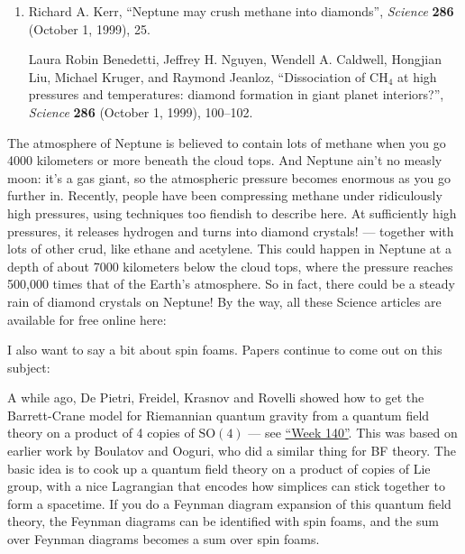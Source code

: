 \documentclass{article}
\def\tightlist{}
\renewcommand{\texttt}[1]{%
  \begingroup
  \ttfamily
  \begingroup\lccode`~=`/\lowercase{\endgroup\def~}{/\discretionary{}{}{}}%
  \begingroup\lccode`~=`[\lowercase{\endgroup\def~}{[\discretionary{}{}{}}%
  \begingroup\lccode`~=`.\lowercase{\endgroup\def~}{.\discretionary{}{}{}}%
  \catcode`/=\active\catcode`[=\active\catcode`.=\active
  \scantokens{#1\noexpand}%
  \endgroup
}
\begin{document}
\begin{enumerate}
\def\labelenumi{\arabic{enumi})}
\setcounter{enumi}{1}
\item
  Richard A. Kerr, ``Neptune may crush methane into diamonds'',
  \emph{Science} \textbf{286} (October 1, 1999), 25.

  Laura Robin Benedetti, Jeffrey H. Nguyen, Wendell A. Caldwell,
  Hongjian Liu, Michael Kruger, and Raymond Jeanloz, ``Dissociation of
  \(\mathrm{CH}_4\) at high pressures and temperatures: diamond
  formation in giant planet interiors?'', \emph{Science} \textbf{286}
  (October 1, 1999), 100--102.
\end{enumerate}

The atmosphere of Neptune is believed to contain lots of methane when
you go 4000 kilometers or more beneath the cloud tops. And Neptune ain't
no measly moon: it's a gas giant, so the atmospheric pressure becomes
enormous as you go further in. Recently, people have been compressing
methane under ridiculously high pressures, using techniques too fiendish
to describe here. At sufficiently high pressures, it releases hydrogen
and turns into diamond crystals! --- together with lots of other crud,
like ethane and acetylene. This could happen in Neptune at a depth of
about 7000 kilometers below the cloud tops, where the pressure reaches
500,000 times that of the Earth's atmosphere. So in fact, there could be
a steady rain of diamond crystals on Neptune! By the way, all these
Science articles are available for free online here:


I also want to say a bit about spin foams. Papers continue to come out
on this subject:


A while ago, De Pietri, Freidel, Krasnov and Rovelli showed how to get
the Barrett-Crane model for Riemannian quantum gravity from a quantum
field theory on a product of 4 copies of $\mathrm{SO}(4)$ --- see
\protect\hyperlink{week140}{``Week 140''}. This was based on earlier
work by Boulatov and Ooguri, who did a similar thing for BF theory. The
basic idea is to cook up a quantum field theory on a product of copies
of Lie group, with a nice Lagrangian that encodes how simplices can
stick together to form a spacetime. If you do a Feynman diagram
expansion of this quantum field theory, the Feynman diagrams can be
identified with spin foams, and the sum over Feynman diagrams becomes a
sum over spin foams.
\end{document}
